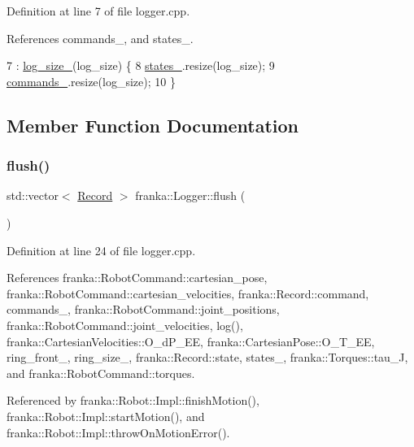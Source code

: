 Definition at line 7 of file logger.\+cpp.



References commands\+\_\+, and states\+\_\+.


\begin{DoxyCode}
7                               : \hyperlink{classfranka_1_1Logger_ac4d8294e724b3e1ada3ddbcdfc14e245}{log\_size\_}(log\_size) \{
8   \hyperlink{classfranka_1_1Logger_aea60d37797979d786e7653168cf49ecb}{states\_}.resize(log\_size);
9   \hyperlink{classfranka_1_1Logger_acbc69d24663395732ac72d274146eb5f}{commands\_}.resize(log\_size);
10 \}
\end{DoxyCode}


\subsection{Member Function Documentation}
\mbox{\label{classfranka_1_1Logger_a44b15a95e25dabe93f797c1d9651fb6e}} 
\subsubsection{\texorpdfstring{flush()}{flush()}}
{\footnotesize\ttfamily std\+::vector$<$ \hyperlink{structfranka_1_1Record}{Record} $>$ franka\+::\+Logger\+::flush (\begin{DoxyParamCaption}{ }\end{DoxyParamCaption})}



Definition at line 24 of file logger.\+cpp.



References franka\+::\+Robot\+Command\+::cartesian\+\_\+pose, franka\+::\+Robot\+Command\+::cartesian\+\_\+velocities, franka\+::\+Record\+::command, commands\+\_\+, franka\+::\+Robot\+Command\+::joint\+\_\+positions, franka\+::\+Robot\+Command\+::joint\+\_\+velocities, log(), franka\+::\+Cartesian\+Velocities\+::\+O\+\_\+d\+P\+\_\+\+EE, franka\+::\+Cartesian\+Pose\+::\+O\+\_\+\+T\+\_\+\+EE, ring\+\_\+front\+\_\+, ring\+\_\+size\+\_\+, franka\+::\+Record\+::state, states\+\_\+, franka\+::\+Torques\+::tau\+\_\+J, and franka\+::\+Robot\+Command\+::torques.



Referenced by franka\+::\+Robot\+::\+Impl\+::finish\+Motion(), franka\+::\+Robot\+::\+Impl\+::start\+Motion(), and franka\+::\+Robot\+::\+Impl\+::throw\+On\+Motion\+Error().


